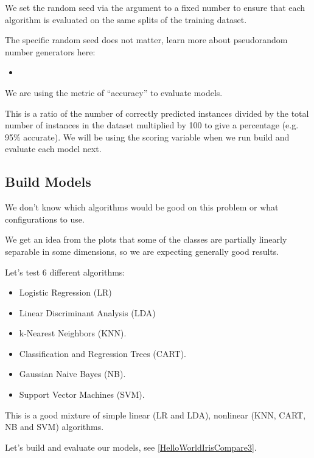 We set the random seed via the argument  to a fixed number to ensure that each algorithm is evaluated on the same splits of the training dataset.
    
The specific random seed does not matter, learn more about pseudorandom number generators here:
    
\begin{itemize}
  \item {}
\end{itemize}     
    
We are using the metric of ``accuracy'' to evaluate models.
    
This is a ratio of the number of correctly predicted instances divided by the total number of instances in the dataset multiplied by 100 to give a percentage (e.g. 95\% accurate). We will be using the scoring variable when we run build and evaluate each model next.
    
    
\subsection{Build Models}

We don't know which algorithms would be good on this problem or what configurations to use.
    
We get an idea from the plots that some of the classes are partially linearly separable in some dimensions, so we are expecting generally good results.
    
Let's test 6 different algorithms:

\begin{itemize}
  \item Logistic Regression (LR)
  \item Linear Discriminant Analysis (LDA)
  \item k-Nearest Neighbors (KNN).
  \item Classification and Regression Trees (CART).
  \item Gaussian Naive Bayes (NB).
  \item Support Vector Machines (SVM).
\end{itemize}

This is a good mixture of simple linear (LR and LDA), nonlinear (KNN, CART, NB and SVM) algorithms.
    
Let's build and evaluate our models, see \ref{HelloWorldIrisCompare3}.

